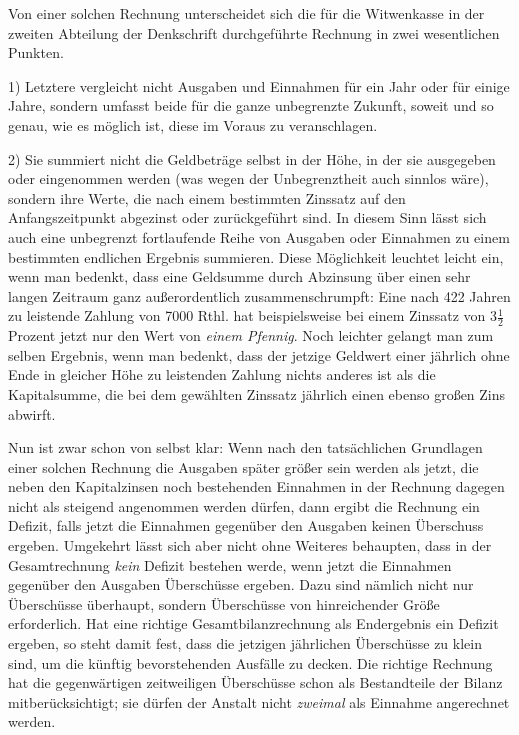 Von einer solchen Rechnung unterscheidet sich die für die Witwenkasse in der zweiten Abteilung der Denkschrift durchgeführte Rechnung in zwei wesentlichen Punkten.

1) Letztere vergleicht nicht Ausgaben und Einnahmen für ein Jahr oder für einige Jahre, sondern umfasst beide für die ganze unbegrenzte Zukunft, soweit und so genau, wie es möglich ist, diese im Voraus zu veranschlagen.

2) Sie summiert nicht die Geldbeträge selbst in der Höhe, in der sie ausgegeben oder eingenommen werden (was wegen der Unbegrenztheit auch sinnlos wäre), sondern ihre Werte, die nach einem bestimmten Zinssatz auf den Anfangszeitpunkt abgezinst oder zurückgeführt sind. In diesem Sinn lässt sich auch eine unbegrenzt fortlaufende Reihe von Ausgaben oder Einnahmen zu einem bestimmten endlichen Ergebnis summieren. Diese Möglichkeit leuchtet leicht ein, wenn man bedenkt, dass eine Geldsumme durch Abzinsung über einen sehr langen Zeitraum ganz außerordentlich zusammenschrumpft: Eine nach 422 Jahren zu leistende Zahlung von 7000 Rthl. hat beispielsweise bei einem Zinssatz von \(3\tfrac{1}{2}\) Prozent jetzt nur den Wert von \textit{einem Pfennig}. Noch leichter gelangt man zum selben Ergebnis, wenn man bedenkt, dass der jetzige Geldwert einer jährlich ohne Ende in gleicher Höhe zu leistenden Zahlung nichts anderes ist als die Kapitalsumme, die bei dem gewählten Zinssatz jährlich einen ebenso großen Zins abwirft.

Nun ist zwar schon von selbst klar: Wenn nach den tatsächlichen Grundlagen einer solchen Rechnung die Ausgaben später größer sein werden als jetzt, die neben den Kapitalzinsen noch bestehenden Einnahmen in der Rechnung dagegen nicht als steigend angenommen werden dürfen, dann ergibt die Rechnung ein Defizit, falls jetzt die Einnahmen gegenüber den Ausgaben keinen Überschuss ergeben. Umgekehrt lässt sich aber nicht ohne Weiteres behaupten, dass in der Gesamtrechnung \textit{kein} Defizit bestehen werde, wenn jetzt die Einnahmen gegenüber den Ausgaben Überschüsse ergeben. Dazu sind nämlich nicht nur Überschüsse überhaupt, sondern Überschüsse von hinreichender Größe erforderlich. Hat eine richtige Gesamtbilanzrechnung als Endergebnis ein Defizit ergeben, so steht damit fest, dass die jetzigen jährlichen Überschüsse zu klein sind, um die künftig bevorstehenden Ausfälle zu decken. Die richtige Rechnung hat die gegenwärtigen zeitweiligen Überschüsse schon als Bestandteile der Bilanz mitberücksichtigt; sie dürfen der Anstalt nicht \textit{zweimal} als Einnahme angerechnet werden.

